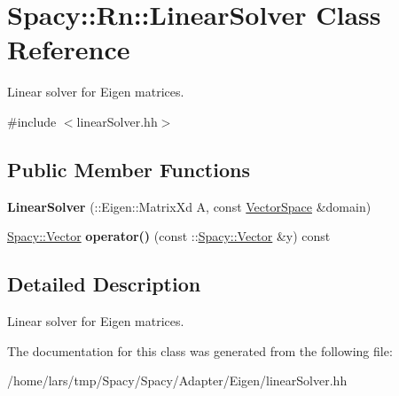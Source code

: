 \hypertarget{classSpacy_1_1Rn_1_1LinearSolver}{}\section{Spacy\+:\+:Rn\+:\+:Linear\+Solver Class Reference}
\label{classSpacy_1_1Rn_1_1LinearSolver}


Linear solver for Eigen matrices.  




{\ttfamily \#include $<$linear\+Solver.\+hh$>$}

\subsection*{Public Member Functions}
\begin{DoxyCompactItemize}
\item 
{\bfseries Linear\+Solver} (\+::Eigen\+::\+Matrix\+Xd A, const \hyperlink{classSpacy_1_1VectorSpace}{Vector\+Space} \&domain)\hypertarget{classSpacy_1_1Rn_1_1LinearSolver_ac50d2a63149b336622ecd4114d2cfe5a}{}\label{classSpacy_1_1Rn_1_1LinearSolver_ac50d2a63149b336622ecd4114d2cfe5a}

\item 
\hyperlink{classSpacy_1_1Vector}{Spacy\+::\+Vector} {\bfseries operator()} (const \+::\hyperlink{classSpacy_1_1Vector}{Spacy\+::\+Vector} \&y) const \hypertarget{classSpacy_1_1Rn_1_1LinearSolver_a11483b4db3dd9f91ffbcea121c0eadd4}{}\label{classSpacy_1_1Rn_1_1LinearSolver_a11483b4db3dd9f91ffbcea121c0eadd4}

\end{DoxyCompactItemize}


\subsection{Detailed Description}
Linear solver for Eigen matrices. 

The documentation for this class was generated from the following file\+:\begin{DoxyCompactItemize}
\item 
/home/lars/tmp/\+Spacy/\+Spacy/\+Adapter/\+Eigen/linear\+Solver.\+hh\end{DoxyCompactItemize}
